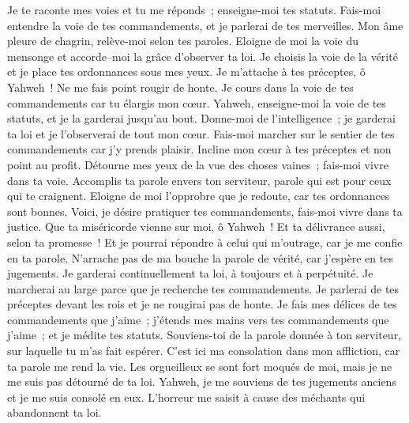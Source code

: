 \begin{multicols}{2}
Je te raconte mes voies et tu me réponds~; enseigne-moi tes statuts.
Fais-moi entendre la voie de tes commandements, et je parlerai de tes merveilles.
Mon âme pleure de chagrin, relève-moi selon tes paroles.
Eloigne de moi la voie du mensonge et accorde–moi la grâce d'observer ta loi.
Je choisis la voie de la vérité et je place tes ordonnances sous mes yeux.
Je m'attache à tes préceptes, ô Yahweh~! Ne me fais point rougir de honte.
Je cours dans la voie de tes commandements car tu élargis mon cœur.
 Yahweh, enseigne-moi la voie de tes statuts, et je la garderai jusqu'au bout.
Donne-moi de l'intelligence~; je garderai ta loi et je l'observerai de tout mon cœur.
Fais-moi marcher sur le sentier de tes commandements car j'y prends plaisir.
Incline mon cœur à tes préceptes et non point au profit.
Détourne mes yeux de la vue des choses vaines~; fais-moi vivre dans ta voie.
Accomplis ta parole envers ton serviteur, parole qui est pour ceux qui te craignent.
Eloigne de moi l'opprobre que je redoute, car tes ordonnances sont bonnes.
Voici, je désire pratiquer tes commandements, fais-moi vivre dans ta justice.
 Que ta miséricorde vienne sur moi, ô Yahweh~! Et ta délivrance aussi, selon ta promesse~!
Et je pourrai répondre à celui qui m'outrage, car je me confie en ta parole.
N'arrache pas de ma bouche la parole de vérité, car j'espère en tes jugements.
Je garderai continuellement ta loi, à toujours et à perpétuité.
Je marcherai au large parce que je recherche tes commandements.
Je parlerai de tes préceptes devant les rois et je ne rougirai pas de honte.
Je fais mes délices de tes commandements que j'aime~;
j'étends mes mains vers tes commandements que j'aime~; et je médite tes statuts.
 Souviens-toi de la parole donnée à ton serviteur, sur laquelle tu m'as fait espérer.
C'est ici ma consolation dans mon affliction, car ta parole me rend la vie.
Les orgueilleux se sont fort moqués de moi, mais je ne me suis pas détourné de ta loi.
Yahweh, je me souviens de tes jugements anciens et je me suis consolé en eux.
L'horreur me saisit à cause des méchants qui abandonnent ta loi.

\end{multicols}
